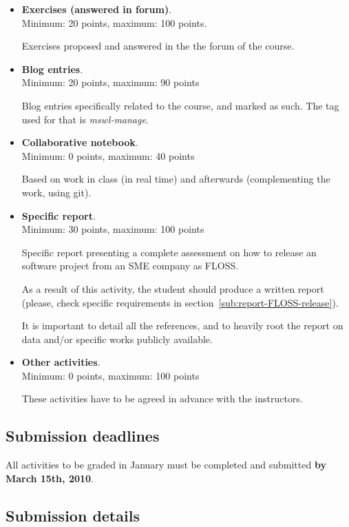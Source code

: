 \documentclass[a4paper]{article}
\begin{document}
\begin{itemize}
\item \textbf{Exercises (answered in forum)}. \\
  Minimum: 20 points, maximum: 100 points.

  Exercises proposed and answered in the the forum of the course.

\item \textbf{Blog entries}. \\
  Minimum: 20 points, maximum: 90 points

  Blog entries specifically related to the course, and marked as such. The tag used for that is \textit{mswl-manage}.

\item \textbf{Collaborative notebook}. \\
  Minimum: 0 points, maximum: 40 points

  Based on work in class (in real time) and afterwards (complementing the work, using git).

\item \textbf{Specific report}. \\
  Minimum: 30 points, maximum: 100 points

Specific report presenting a complete assessment on how to release an software project from an SME company as FLOSS.

As a result of this activity, the student should produce a written report (please, check specific requirements in section~\ref{sub:report-FLOSS-release}).

It is important to detail all the references, and to heavily root the report on data and/or specific works publicly available.

\item \textbf{Other activities}. \\
  Minimum: 0 points, maximum: 100 points

  These activities have to be agreed in advance with the instructors.
\end{itemize}

\subsection{Submission deadlines}

All activities to be graded in January must be completed and submitted \textbf{by March 15th, 2010}.

\subsection{Submission details}
\end{document}
